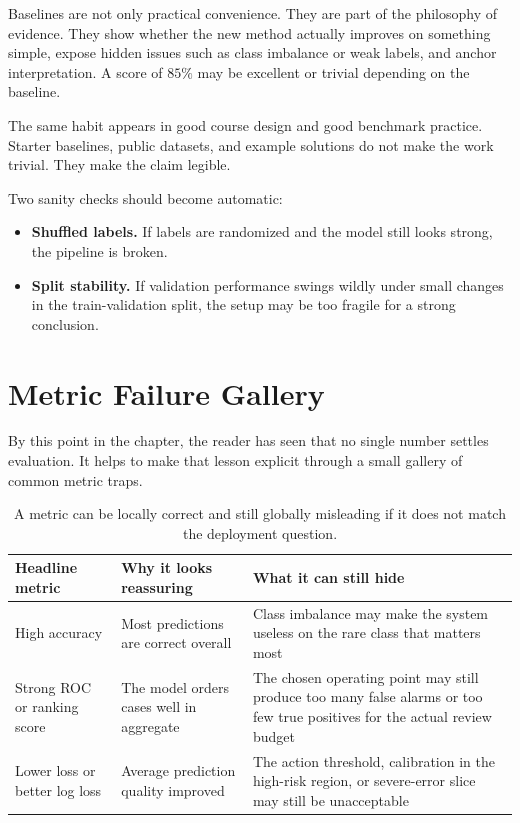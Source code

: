 Baselines are not only practical convenience. They are part of the philosophy of evidence. They show whether the new method actually improves on something simple, expose hidden issues such as class imbalance or weak labels, and anchor interpretation. A score of $85\%$ may be excellent or trivial depending on the baseline.

The same habit appears in good course design and good benchmark practice. Starter baselines, public datasets, and example solutions do not make the work trivial. They make the claim legible.

\begin{practicalnote}
Two sanity checks should become automatic:
\begin{itemize}[leftmargin=*]
\item \textbf{Shuffled labels.} If labels are randomized and the model still looks strong, the pipeline is broken.
\item \textbf{Split stability.} If validation performance swings wildly under small changes in the train-validation split, the setup may be too fragile for a strong conclusion.
\end{itemize}
\end{practicalnote}

\section{Metric Failure Gallery}

By this point in the chapter, the reader has seen that no single number settles evaluation. It helps to make that lesson explicit through a small gallery of common metric traps.

\begin{table}[t]
\centering
\small
\setlength{\tabcolsep}{4pt}
\begin{tabular}{@{}>{\raggedright\arraybackslash}p{2.13cm}>{\raggedright\arraybackslash}p{2.54cm}>{\raggedright\arraybackslash}p{5.57cm}@{}}
\toprule
Headline metric & Why it looks reassuring & What it can still hide \\
\midrule
High accuracy & Most predictions are correct overall & Class imbalance may make the system useless on the rare class that matters most \\
Strong ROC or ranking score & The model orders cases well in aggregate & The chosen operating point may still produce too many false alarms or too few true positives for the actual review budget \\
Lower loss or better log loss & Average prediction quality improved & The action threshold, calibration in the high-risk region, or severe-error slice may still be unacceptable \\
\bottomrule
\end{tabular}
\caption{A metric can be locally correct and still globally misleading if it does not match the deployment question.}
\label{tab:evaluation-metric-failure-gallery}
\end{table}

